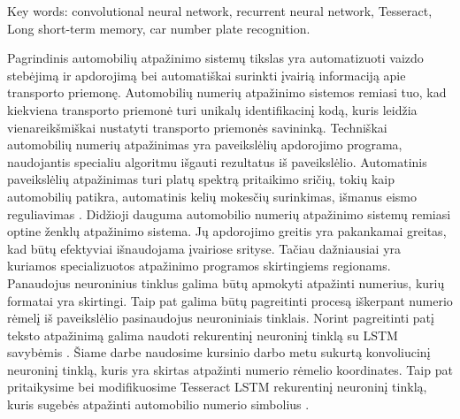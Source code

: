 \documentclass{VUMIFInfBakalaurinis}
\begin{document}
Key words: convolutional neural network, recurrent neural network, Tesseract, Long short-term memory, car number plate recognition.

\newpage
\tableofcontents

\pagebreak
{}
Pagrindinis automobilių atpažinimo sistemų tikslas yra automatizuoti vaizdo stebėjimą ir
apdorojimą bei automatiškai surinkti įvairią informaciją apie transporto priemonę. Automobilių
numerių atpažinimo sistemos remiasi tuo, kad kiekviena transporto priemonė turi unikalų 
identifikacinį kodą, kuris leidžia vienareikšmiškai nustatyti transporto priemonės savininką. Techniškai
automobilių numerių atpažinimas yra paveikslėlių apdorojimo programa, naudojantis specialiu 
algoritmu išgauti rezultatus iš paveikslėlio. Automatinis paveikslėlių atpažinimas turi platų spektrą
pritaikimo sričių, tokių kaip automobilių patikra, automatinis kelių mokesčių surinkimas, išmanus
eismo reguliavimas \cite{bhushan2013license}. Didžioji dauguma automobilio numerių atpažinimo sistemų remiasi
optine ženklų atpažinimo sistema. Jų apdorojimo greitis yra pakankamai greitas, kad būtų 
efektyviai išnaudojama įvairiose srityse. Tačiau dažniausiai yra kuriamos specializuotos atpažinimo
programos skirtingiems regionams. Panaudojus neuroninius tinklus galima būtų apmokyti 
atpažinti numerius, kurių formatai yra skirtingi. Taip pat galima būtų pagreitinti procesą iškerpant
numerio rėmelį iš paveikslėlio pasinaudojus neuroniniais tinklais. Norint pagreitinti patį 
teksto atpažinimą galima naudoti rekurentinį neuroninį tinklą su LSTM savybėmis \cite{li2016reading}. Šiame
darbe naudosime kursinio darbo metu sukurtą konvoliucinį neuroninį tinklą, kuris yra skirtas 
atpažinti numerio rėmelio koordinates. Taip pat pritaikysime bei modifikuosime Tesseract LSTM
rekurentinį neuroninį tinklą, kuris sugebės atpažinti automobilio numerio simbolius \cite{smith2007overview}.
\end{document}
